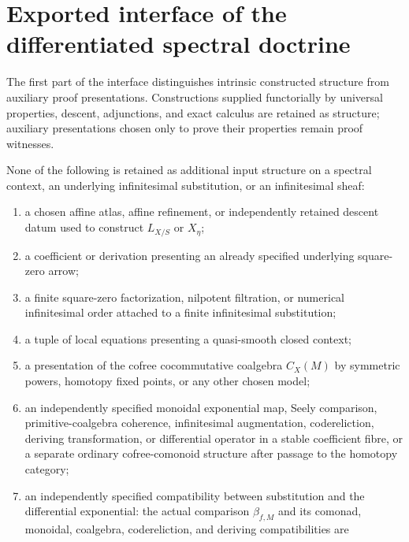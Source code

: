\section{Exported interface of the differentiated spectral doctrine}
\label{sec:differentiated-spectral-doctrine-interface}
\label{sec:differentiated-doctrine-audit}

The first part of the interface distinguishes intrinsic constructed structure
from auxiliary proof presentations. Constructions supplied functorially by
universal properties, descent, adjunctions, and exact calculus are retained as
structure; auxiliary presentations chosen only to prove their properties
remain proof witnesses.

\begin{theorem}
\label{thm:differentiated-no-hidden-axioms}
None of the following is retained as additional input structure on a spectral
context, an underlying infinitesimal substitution, or an infinitesimal sheaf:
\begin{enumerate}[label=(\roman*)]
    \item a chosen affine atlas, affine refinement, or independently retained
    descent datum used to construct \(L_{X/S}\) or \(X_\eta\);
    \item a coefficient or derivation presenting an already specified
    underlying square-zero arrow;
    \item a finite square-zero factorization, nilpotent filtration, or numerical
    infinitesimal order attached to a finite infinitesimal substitution;
    \item a tuple of local equations presenting a quasi-smooth closed context;
    \item a presentation of the cofree cocommutative coalgebra \(C_X(M)\) by
    symmetric powers, homotopy fixed points, or any other chosen model;
    \item an independently specified monoidal exponential map, Seely
    comparison, primitive-coalgebra coherence, infinitesimal augmentation,
    codereliction, deriving transformation, or differential operator in a
    stable coefficient fibre, or a separate ordinary cofree-comonoid structure after
    passage to the homotopy category;
    \item an independently specified compatibility between substitution and the
    differential exponential: the actual comparison \(\beta_{f,M}\) and its
    comonad, monoidal, coalgebra, codereliction, and deriving compatibilities are

\end{enumerate}
\end{theorem}
